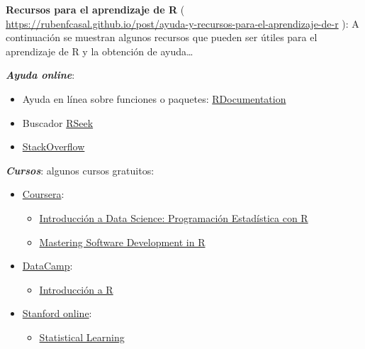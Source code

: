 \documentclass[]{book}
\providecommand{\tightlist}{%
  \setlength{\itemsep}{0pt}\setlength{\parskip}{0pt}}
\begin{document}
\textbf{Recursos para el aprendizaje de R} ( \url{https://rubenfcasal.github.io/post/ayuda-y-recursos-para-el-aprendizaje-de-r}
): A continuación se muestran algunos recursos que pueden ser útiles para el aprendizaje de R y la obtención de ayuda\ldots{}

\textbf{\emph{Ayuda online}}:

\begin{itemize}
\item
  Ayuda en línea sobre funciones o paquetes: \href{https://www.rdocumentation.org/}{RDocumentation}
\item
  Buscador \href{http://rseek.org/}{RSeek}
\item
  \href{http://stackoverflow.com/questions/tagged/r}{StackOverflow}
\end{itemize}

\textbf{\emph{Cursos}}:
algunos cursos gratuitos:

\begin{itemize}
\item
  \href{https://www.coursera.org/}{Coursera}:

  \begin{itemize}
  \item
    \href{https://www.coursera.org/learn/intro-data-science-programacion-estadistica-r}{Introducción a Data Science: Programación Estadística con R}
  \item
    \href{https://www.coursera.org/specializations/r}{Mastering Software Development in R}
  \end{itemize}
\end{itemize}

\begin{itemize}
\item
  \href{https://www.datacamp.com/courses}{DataCamp}:

  \begin{itemize}
  \tightlist
  \item
    \href{https://www.datacamp.com/courses/introduccion-a-r/}{Introducción a R}
  \end{itemize}
\end{itemize}

\begin{itemize}
\item
  \href{http://online.stanford.edu/courses}{Stanford online}:

  \begin{itemize}
  \tightlist
  \item
    \href{http://online.stanford.edu/course/statistical-learning}{Statistical Learning}
  \end{itemize}
\end{itemize}
\end{document}
